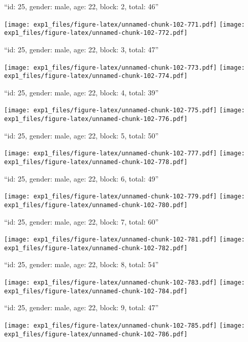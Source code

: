 \documentclass[11pt,,]{article}
\begin{document}
\newpage
[1] 

``id: 25, gender: male, age: 22, block: 2, total: 46''

\texttt{[image: exp1\_files/figure-latex/unnamed-chunk-102-771.pdf]}
\texttt{[image: exp1\_files/figure-latex/unnamed-chunk-102-772.pdf]}

\newpage
[1] 

``id: 25, gender: male, age: 22, block: 3, total: 47''

\texttt{[image: exp1\_files/figure-latex/unnamed-chunk-102-773.pdf]}
\texttt{[image: exp1\_files/figure-latex/unnamed-chunk-102-774.pdf]}

\newpage
[1] 

``id: 25, gender: male, age: 22, block: 4, total: 39''

\texttt{[image: exp1\_files/figure-latex/unnamed-chunk-102-775.pdf]}
\texttt{[image: exp1\_files/figure-latex/unnamed-chunk-102-776.pdf]}

\newpage
[1] 

``id: 25, gender: male, age: 22, block: 5, total: 50''

\texttt{[image: exp1\_files/figure-latex/unnamed-chunk-102-777.pdf]}
\texttt{[image: exp1\_files/figure-latex/unnamed-chunk-102-778.pdf]}

\newpage
[1] 

``id: 25, gender: male, age: 22, block: 6, total: 49''

\texttt{[image: exp1\_files/figure-latex/unnamed-chunk-102-779.pdf]}
\texttt{[image: exp1\_files/figure-latex/unnamed-chunk-102-780.pdf]}

\newpage
[1] 

``id: 25, gender: male, age: 22, block: 7, total: 60''

\texttt{[image: exp1\_files/figure-latex/unnamed-chunk-102-781.pdf]}
\texttt{[image: exp1\_files/figure-latex/unnamed-chunk-102-782.pdf]}

\newpage
[1] 

``id: 25, gender: male, age: 22, block: 8, total: 54''

\texttt{[image: exp1\_files/figure-latex/unnamed-chunk-102-783.pdf]}
\texttt{[image: exp1\_files/figure-latex/unnamed-chunk-102-784.pdf]}

\newpage
[1] 

``id: 25, gender: male, age: 22, block: 9, total: 47''

\texttt{[image: exp1\_files/figure-latex/unnamed-chunk-102-785.pdf]}
\texttt{[image: exp1\_files/figure-latex/unnamed-chunk-102-786.pdf]}
\end{document}
